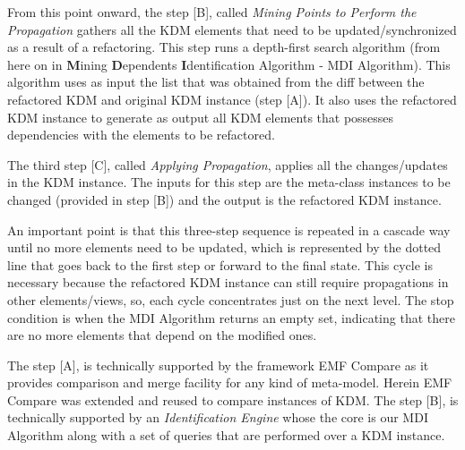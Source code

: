 From this point onward, the step [B], called \textit{Mining Points to Perform the Propagation} gathers all the KDM elements that need to be updated/synchronized as a result of a refactoring. %
This step runs a depth-first search algorithm (from here on in \textbf{M}ining \textbf{D}ependents \textbf{I}dentification Algorithm - MDI Algorithm). This algorithm uses as input the list that was obtained from the diff between the refactored KDM and original KDM instance (step [A]).
It also uses the refactored KDM instance to generate as output all KDM elements that possesses dependencies with the elements to be refactored. 

The third step [C], called \textit{Applying Propagation}, applies all the changes/updates in the KDM instance. The inputs for this step are the meta-class instances to be changed (provided in step [B]) and the output is the refactored KDM instance.

An important point is that this three-step sequence is repeated in a cascade way until no more elements need to be updated, which is represented by the dotted line that goes back to the first step or forward to the final state. This cycle is necessary because the refactored KDM instance can still require propagations in other elements/views, so, each cycle concentrates just on the next level. The stop condition is when the MDI Algorithm returns an empty set, indicating that there are no more elements that depend on the modified ones.

The step [A], is technically supported by the framework EMF Compare as it provides comparison and merge facility for any kind of meta-model. Herein EMF Compare was extended and reused to compare instances of KDM. The step [B], is technically supported by an \textit{Identification Engine} whose the core is our MDI Algorithm along with a set of queries that are performed over a KDM instance. %


